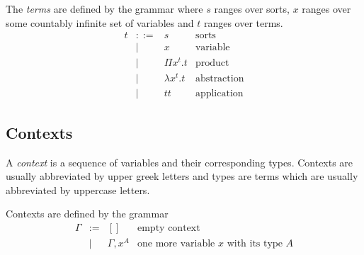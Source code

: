 \begin{definition}
    The \emph{terms} are defined by the grammar where $s$ ranges over sorts, $x$
    ranges over some countably infinite set of variables and $t$ ranges over
    terms.
    $$
    \begin{array}{llll}
        t

        &::=& s & \text{sorts}

        \\

        &\mid & x & \text{variable}

        \\

        &\mid & \Pi x^t. t & \text{product}

        \\

        &\mid & \lambda x^t. t & \text{abstraction}

        \\

        &\mid & t t & \text{application}
    \end{array}
    $$
\end{definition}







\subsection{Contexts}


\begin{definition}
    A \emph{context} is a sequence of variables and their corresponding types.
    Contexts are usually abbreviated by upper greek letters and types are terms
    which are usually abbreviated by uppercase letters.

    Contexts are defined by the grammar
    $$
    \begin{array}{llll}
        \Gamma
        &:=& [] & \text{empty context}

        \\

        &\mid& \Gamma, x^A & \text{one more variable $x$ with its type $A$}
    \end{array}
    $$
\end{definition}







